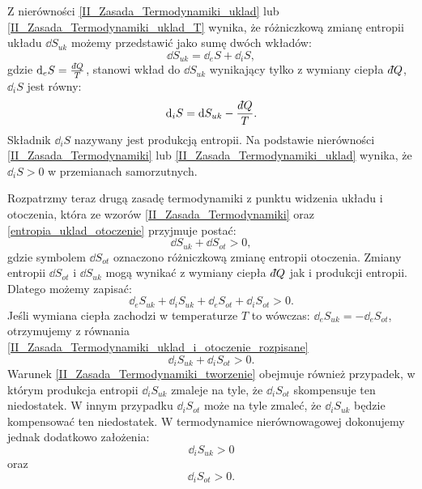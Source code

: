 \documentclass[10pt, a4paper, twoside, onecolumn]{article}
\numberwithin{equation}{section}
\newcommand{\dbar}{d\hspace*{-0.08em}\bar{}\hspace*{0.1em}}
\begin{document}
	Z nierówności \eqref{II_Zasada_Termodynamiki_uklad} lub \eqref{II_Zasada_Termodynamiki_uklad_T} wynika, że różniczkową zmianę entropii układu \(\dd{S_{uk}}\) możemy przedstawić jako sumę dwóch wkładów:
	\begin{equation}
		\dd{S_{uk}}=\dd_{e}S+\dd_{i}S,
	\end{equation}
	gdzie \(\dd_{e}S=\frac{\dbar Q}{T}\), stanowi wkład do \(\dd{S_{uk}}\) wynikający tylko z wymiany ciepła \(\dbar Q\), \(\dd_{i}S\) jest równy:
	\begin{equation}
		\dd_{i}S=\dd{S_{uk}}-\frac{\dbar Q}{T}.
	\end{equation}
	Składnik \(\dd_{i}S\) nazywany jest produkcją entropii. Na podstawie nierówności \eqref{II_Zasada_Termodynamiki} lub \eqref{II_Zasada_Termodynamiki_uklad} wynika, że \(\dd_{i}S>0\) w przemianach samorzutnych. \par
	Rozpatrzmy teraz drugą zasadę termodynamiki z punktu widzenia układu i otoczenia, która ze wzorów \eqref{II_Zasada_Termodynamiki} oraz \eqref{entropia_uklad_otoczenie} przyjmuje postać:
	\begin{equation}\label{II_Zasada_Termodynamiki_uklad_i_otoczenie}
		\dd{S_{uk}}+\dd{S_{ot}}>0,
	\end{equation}
	gdzie symbolem \(\dd{S_{ot}}\) oznaczono różniczkową zmianę entropii otoczenia. Zmiany entropii \(\dd{S_{ot}}\) i \(\dd{S_{uk}}\) mogą wynikać z wymiany ciepła \(\dbar Q\) jak i produkcji entropii. Dlatego możemy zapisać:
	\begin{equation}\label{II_Zasada_Termodynamiki_uklad_i_otoczenie_rozpisane}
		\dd_{e}S_{uk}+\dd_{i}S_{uk}+\dd_{e}S_{ot}+\dd_{i}S_{ot}>0.
	\end{equation}
	Jeśli wymiana ciepła zachodzi w temperaturze \(T\) to wówczas: \(\dd_{e}S_{uk}=-\dd_{e}S_{ot}\), otrzymujemy z równania \eqref{II_Zasada_Termodynamiki_uklad_i_otoczenie_rozpisane} 
	\begin{equation}\label{II_Zasada_Termodynamiki_tworzenie}
		\dd_{i}S_{uk}+\dd_{i}S_{ot}>0.
	\end{equation}
	Warunek \eqref{II_Zasada_Termodynamiki_tworzenie} obejmuje również przypadek, w którym produkcja entropii \(\dd_{i}S_{uk}\) zmaleje na tyle, że \(\dd_{i}S_{ot}\) skompensuje ten niedostatek. W innym przypadku \(\dd_{i}S_{ot}\) może na tyle zmaleć, że \(\dd_{i}S_{uk}\) będzie kompensować ten niedostatek. W termodynamice nierównowagowej dokonujemy jednak dodatkowo założenia:
	\begin{equation*}
		\dd_{i}S_{uk}>0
	\end{equation*}
	oraz
	\begin{equation*}
		\dd_{i}S_{ot}>0.
	\end{equation*}
	
\end{document}
